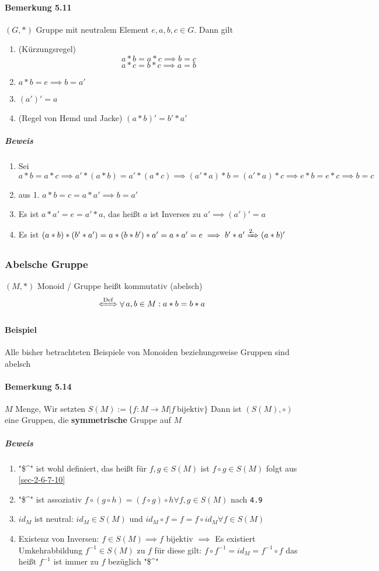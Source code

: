 \documentclass[a4paper]{scrartcl}
\DeclareMathOperator{\Forall}{\forall}
\theoremstyle{definition}
\theoremstyle{plain}
\theoremstyle{plain}
\theoremstyle{remark}
\theoremstyle{remark}
\theoremstyle{remark}
\theoremstyle{remark}
\theoremstyle{remark}
\begin{document}
\paragraph{Bemerkung 5.11}
\label{sec-3-1-4-2}
$(G,*)$ Gruppe mit neutralem Element $e,a,b,c \in G$. Dann gilt
\begin{enumerate}
\item (Kürzungsregel) \[a*b = a*c \implies b = c\] \[a*c = b * c \implies a = b\]
\item $a*b = e \implies b = a'$
\item $(a')' = a$
\item (Regel von Hemd und Jacke) $(a*b)' = b' * a'$
\end{enumerate}
\subparagraph{Beweis}
\label{sec-3-1-4-2-1}
\begin{enumerate}
\item Sei $a * b = a * c \implies a'*(a*b) = a'*(a*c) \implies (a'*a)*b=(a'*a)*c \implies e*b = e*c \implies b = c$
\item aus 1. $a*b = c = a*a' \implies b = a'$
\item Es ist $a*a' = e = a' * a$, das heißt $a$ ist Inverses zu $a' \implies (a')' = a$
\item Es ist $(a*b)*(b'*a') = a*(b*b')*a' = a*a' = e \implies b' * a' \xRightarrow{\text{2.}} (a *b)'$
\end{enumerate}
\subsubsection{Abelsche Gruppe}
\label{sec-3-1-5}
$(M,*)$ Monoid / Gruppe heißt kommutativ (abelsch)
\[\xLeftrightarrow{\text{Def}} \Forall a,b\in M: a*b = b*a\]
\paragraph{Beispiel}
\label{sec-3-1-5-1}
Alle bisher betrachteten Beispiele von Monoiden beziehungsweise Gruppen sind abelsch
\paragraph{Bemerkung 5.14}
\label{sec-3-1-5-2}
$M$ Menge, Wir setzten $S(M):= \{f:M\to M | f~\text{bijektiv}\}$
Dann ist $(S(M),\circ)$ eine Gruppen, die \textbf{symmetrische} Gruppe auf $M$
\subparagraph{Beweis}
\label{sec-3-1-5-2-1}
\begin{enumerate}
\item "\$\^{}" ist wohl definiert, das heißt für $f,g\in S(M)$ ist $f\circ g \in S(M)$ folgt aus \ref{sec-2-6-7-10}
\item "\$\^{}" ist assoziativ $f\circ(g\circ h) = (f\circ g) \circ h \Forall f,g\in S(M)$ nach \texttt{4.9}
\item $id_M$ ist neutral: $id_M \in S(M)$ und $id_M\circ f = f = f\circ id_M \Forall f\in S(M)$
\item Existenz von Inversen: $f\in S(M) \implies f$ bijektiv $\implies$ Es existiert Umkehrabbildung $f^{-1}\in S(M)$ zu $f$
         für diese gilt: $f\circ f^{-1} = id_M = f^{-1}\circ f$ das heißt $f^{-1}$ ist immer zu $f$ bezüglich "\$\^{}"
\end{enumerate}
\end{document}
